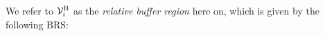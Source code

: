 We refer to $\mathcal{V}^{\text{B}}_{i}$ as the \textit{relative buffer region} here on, which is given by the following BRS:
%
%
%
%
